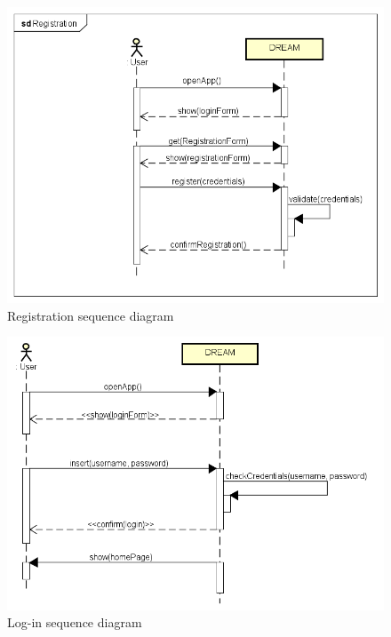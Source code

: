 \newpage
\begin{figure}[H]
    \centering
    \includegraphics[scale=0.7]{Images/RegistrationSequence.png}
    \caption{Registration sequence diagram}
\end{figure}

\bigskip
\begin{figure}[H]
    \centering
    \includegraphics[scale=0.7]{Images/login.png}
    \caption{Log-in sequence diagram}
\end{figure}

